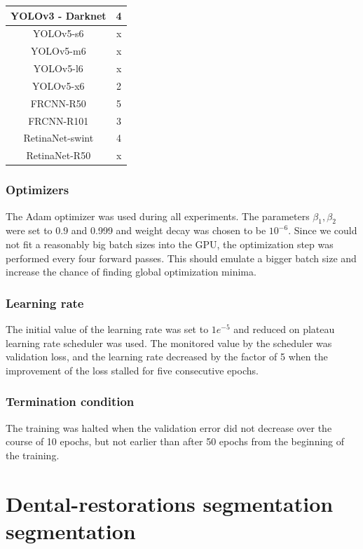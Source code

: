 \begin{table}
    \centering
    \begin{tabular}{|c|c|}
        YOLOv3 - Darknet & 4 \\ \hline
        YOLOv5-s6        & x \\ \hline
        YOLOv5-m6        & x \\ \hline
        YOLOv5-l6        & x \\ \hline
        YOLOv5-x6        & 2 \\ \hline
        FRCNN-R50        & 5 \\ \hline
        FRCNN-R101       & 3 \\ \hline
        RetinaNet-swint  & 4 \\ \hline
        RetinaNet-R50    & x \\ \hline
    \end{tabular}
\end{table}

\subsubsection{Optimizers}
The Adam optimizer was used during all experiments. The parameters $\beta_1, \beta_2$ were set to 0.9 and 0.999 and weight decay was chosen to be $10^{-6}$. Since we could not fit a reasonably big batch sizes into the GPU, the optimization step was performed every four forward passes. This should emulate a bigger batch size and increase the chance of finding global optimization minima.
\subsubsection{Learning rate}
The initial value of the learning rate was set to $1e^{-5}$ and reduced on plateau learning rate scheduler was used. The monitored value by the scheduler was validation loss, and the learning rate decreased by the factor of 5 when the improvement of the loss stalled for five consecutive epochs.
\subsubsection{Termination condition}
The training was halted when the validation error did not decrease over the course of 10 epochs, but not earlier than after 50 epochs from the beginning of the training.


\section{Dental-restorations segmentation segmentation}
